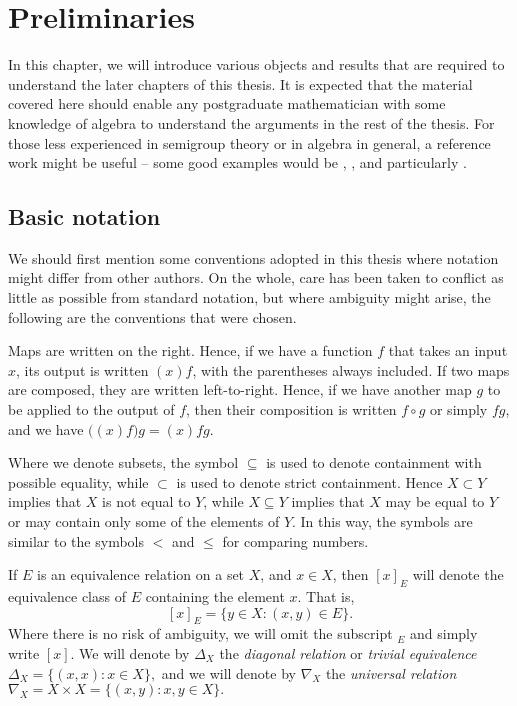\chapter{Preliminaries}
\label{chap:intro}

In this chapter, we will introduce various objects and results that are required
to understand the later chapters of this thesis.  It is expected that the
material covered here should enable any postgraduate mathematician with some
knowledge of algebra to understand the arguments in the rest of the thesis.  For
those less experienced in semigroup theory or in algebra in general, a reference
work might be useful -- some good examples would be \cite{warner},
\cite{petrich}, and particularly \cite{howie}.

\section{Basic notation}
\label{sec:intro-notation}

We should first mention some conventions adopted in this thesis where notation
might differ from other authors.  On the whole, care has been taken to conflict
as little as possible from standard notation, but where ambiguity might arise,
the following are the conventions that were chosen.

Maps are written on the right.  Hence, if we have a function $f$ that takes an
input $x$, its output is written $(x)f$, with the parentheses always included.
If two maps are composed, they are written left-to-right.  Hence, if we have
another map $g$ to be applied to the output of $f$, then their composition is
written $f \circ g$ or simply $fg$, and we have
$\big((x)f\big)g = (x)fg.$

Where we denote subsets, the symbol $\subseteq$ is used to denote containment
with possible equality, while $\subset$ is used to denote strict containment.
Hence $X \subset Y$ implies that $X$ is not equal to $Y$, while $X \subseteq Y$
implies that $X$ may be equal to $Y$ or may contain only some of the elements of
$Y$.  In this way, the symbols are similar to the symbols $<$ and $\leq$ for
comparing numbers.

If $E$ is an equivalence relation on a set $X$, and $x \in X$, then $[x]_E$ will
denote the equivalence class of $E$ containing the element $x$.  That is,
$$[x]_E = \{y \in X : (x,y) \in E\}.$$
Where there is no risk of ambiguity, we will omit the subscript $_E$ and simply
write $[x]$.  We will denote by $\Delta_X$ the \textit{diagonal relation} or
\textit{trivial equivalence}
$\Delta_X = \{(x,x): x \in X\},$
and we will denote by $\nabla_X$ the \textit{universal relation}
$\nabla_X = X \times X = \{(x,y): x,y \in X\}.$

